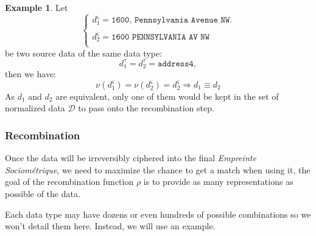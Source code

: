 \documentclass[twoside,twocolumn]{article}
\theoremstyle{definition}
\newtheorem{example}{Example}
\theoremstyle{remark}
\begin{document}
\begin{example}
    Let $$\left\{
        \begin{array}{l}
            d_1^\varsigma = \texttt{1600, Pennsylvania Avenue NW.} \\ \\
            d_2^\varsigma = \texttt{1600 PENNSYLVANIA AV NW} \\
        \end{array}
    \right.$$
    be two source data of the same data type:$$
        d_1^\tau = d_2^\tau = \texttt{address4},
    $$
    then we have:$$
        \nu(d_1^\varsigma) = \nu(d_2^\varsigma) = d_2^\varsigma \Longrightarrow d_1 \equiv d_2
    $$
    As $d_1$ and $d_2$ are equivalent, only one of them would be kept in the set of normalized data $\mathcal{D}$ to pass onto the recombination step.
\end{example}

\subsubsection{Recombination}

Once the data will be irreversibly ciphered into the final \emph{Empreinte Sociométrique}, we need to maximize the chance to get a match when using it, the 
goal of the recombination function $\rho$ is to provide as many representations as possible of the data.

Each data type may have dozens or even hundreds of possible combinations so we won't detail them here.
Instead, we will use an example.
\end{document}
